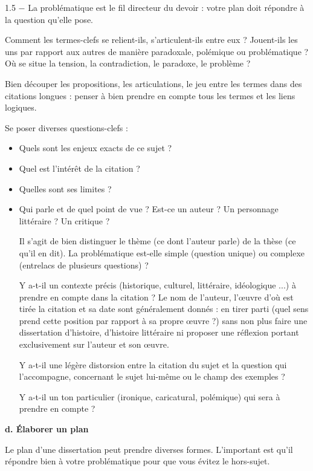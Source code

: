 \documentclass[12pt]{article}
\begin{document}
\begin{spacing}{1.5}
$-$ La problématique est le fil directeur du devoir : votre plan doit répondre à la question qu'elle 
pose.

Comment les termes-clefs se relient-ils, s'articulent-ils entre eux ? Jouent-ils les uns par rapport aux autres de manière paradoxale, polémique ou problématique ? Où se 
situe la tension, la contradiction, le paradoxe, le problème ?
 
 Bien découper les propositions, les articulations, le jeu entre les termes dans des 
citations longues : penser à bien prendre en compte tous les termes et les liens logiques.


 Se poser diverses questions-clefs :
 
 \begin{itemize}
 \item Quels sont les enjeux exacts de ce sujet ?
 \item Quel est l'intérêt de la citation ?
 \item Quelles sont ses limites ?
 \item Qui parle et de quel point de vue ? Est-ce un auteur ? Un personnage littéraire ? Un critique ?
 
 Il s'agit de bien distinguer le thème (ce dont l'auteur parle) de la thèse (ce qu'il en dit).
 La problématique est-elle simple (question unique) ou complexe (entrelacs de 
plusieurs questions) ?
 
 Y a-t-il un contexte précis (historique, culturel, littéraire, idéologique $...$) à prendre en compte dans la citation ? Le nom de l'auteur, l'œuvre d'où est tirée la citation et sa date 
sont généralement donnés : en tirer parti (quel sens prend cette position par rapport à 
sa propre œuvre ?) sans non plus faire une dissertation d'histoire, d'histoire littéraire ni proposer une réflexion portant exclusivement sur l'auteur et son œuvre.
 
 Y a-t-il une légère distorsion entre la citation du sujet et la question qui l'accompagne, concernant le sujet lui-même ou le champ des exemples ?
 
 Y a-t-il un ton particulier (ironique, caricatural, polémique) qui sera à prendre en compte ?
\end{itemize}

\quad

\textbf{d.  Élaborer un plan}

Le plan d'une dissertation peut prendre diverses formes. L'important est qu'il répondre bien à votre problématique pour que vous évitez le hors-sujet.


\end{spacing}
\end{document}
